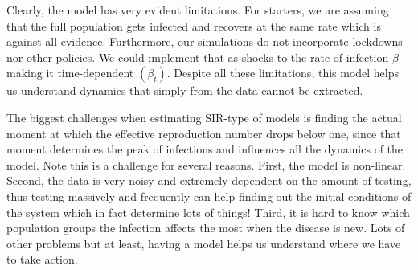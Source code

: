 \documentclass[a4paper,11pt]{article}
\theoremstyle{definition}
\theoremstyle{plain}
\begin{document}
Clearly, the model has very evident limitations. For starters, we are assuming that the full population gets infected and recovers at the same rate which is against all evidence. Furthermore, our simulations do not incorporate lockdowns nor other policies. We could implement that as shocks to the rate of infection \(\beta\) making it time-dependent \((\beta_t)\). Despite all these limitations, this model helps us understand dynamics that simply from the data cannot be extracted.

The biggest challenges when estimating SIR-type of models is finding the actual moment at which the effective reproduction number drops below one, since that moment determines the peak of infections and influences all the dynamics of the model. Note this is a challenge for several reasons. First, the model is non-linear. Second, the data is very noisy and extremely dependent on the amount of testing, thus testing massively and frequently can help finding out the initial conditions of the system which in fact determine lots of things! Third, it is hard to know which population groups the infection affects the most when the disease is new. Lots of other problems but at least, having a model helps us understand where we have to take action.
\end{document}
